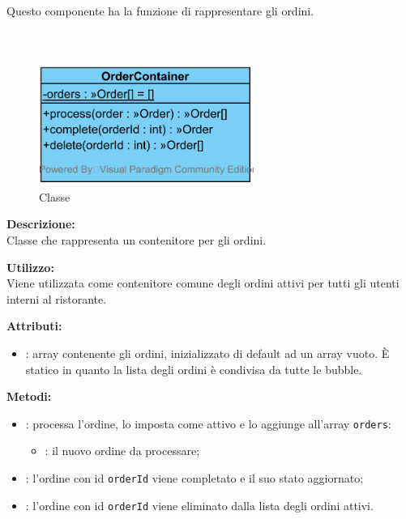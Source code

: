 Questo componente ha la funzione di rappresentare gli ordini.

\subparagraph[::OrderContainer]{\class}\mbox{}\\ \label{\class}
\begin{figure}[H]
	\centering
	\includegraphics[width=7cm]{./diagrammi/demo/server/order/ordercontainer.png}
	\caption{Classe \class}
\end{figure}
\textbf{Descrizione:}\\
Classe che rappresenta un contenitore per gli ordini.

\textbf{Utilizzo:}\\
Viene utilizzata come contenitore comune degli ordini attivi per tutti gli utenti interni al ristorante.

%

\textbf{Attributi:}
\begin{itemize}
	\item {}: array contenente gli ordini, inizializzato di default ad un array vuoto. È statico in quanto la lista degli ordini è condivisa da tutte le bubble.
\end{itemize}

\textbf{Metodi:}
\begin{itemize}
	\item {}: processa l'ordine, lo imposta come attivo e lo aggiunge all'array \texttt{orders}:
	\begin{itemize}
		\item {}: il nuovo ordine da processare;
	\end{itemize}
	\item {}: l'ordine con id \texttt{orderId} viene completato e il suo stato aggiornato;
	\item {}: l'ordine con id \texttt{orderId} viene eliminato dalla lista degli ordini attivi.
\end{itemize}

